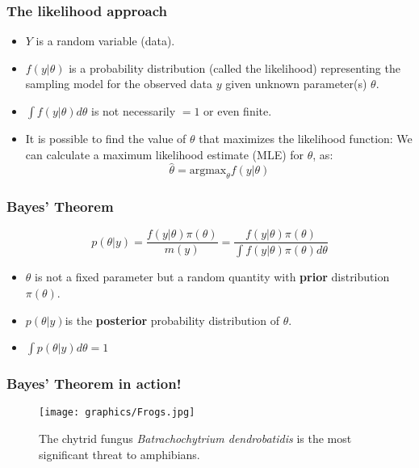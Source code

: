 \documentclass{beamer}
\newcommand{\1}{\ensuremath{\mathbf{1}}}
\begin{document}
\begin{frame}\frametitle{The likelihood approach}
	\begin{block}{}
		\begin{itemize}
			\item $Y$ is a random variable (data).
			\item $f(y|\theta)$ is a probability distribution (called the likelihood) representing the sampling model for the observed data $y$ given unknown parameter(s) $\theta$.
			\item $\int f (y|\theta)d\theta$ is not necessarily $= 1$ or even finite.
			\item It is possible to find the value of $\theta$ that maximizes the likelihood function: We can calculate a maximum likelihood estimate (MLE) for $\theta$, as:
			\begin{equation}
				\hat\theta = \text{argmax}_\theta f (y|\theta)				
			\end{equation}
		\end{itemize}
	\end{block}
\end{frame}
%
%
%
\begin{frame}\frametitle{Bayes’ Theorem}
	\begin{block}{}
		\begin{equation}
			p(\theta|y) = \frac{f (y|\theta)\pi(\theta)}{m(y)} = \frac{f (y|\theta)\pi(\theta)}{\int f (y|\theta)\pi(\theta)d\theta}
		\end{equation}
	\end{block}
	\begin{itemize}
		\item $\theta$ is not a fixed parameter but a random quantity with \textbf{prior} distribution $\pi(\theta)$.
		\item $p(\theta|y) $is the \textbf{posterior} probability distribution of $\theta$.
		\item $\int p(\theta|y) d\theta = 1$
	\end{itemize}
\end{frame}
%
%
%
\begin{frame}\frametitle{Bayes’ Theorem in action!}
	\begin{figure}
	\begin{center}
		\texttt{[image: graphics/Frogs.jpg]}
	\end{center}
	\caption{The chytrid fungus \emph{Batrachochytrium dendrobatidis} is the most significant threat to amphibians.}
	\end{figure}
\end{frame}
\end{document}
